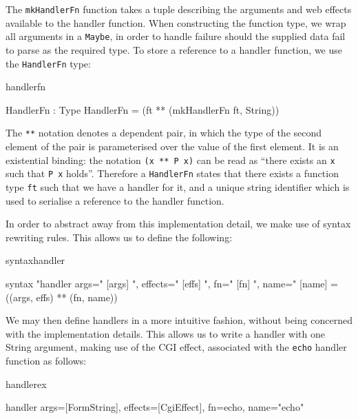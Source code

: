 
\noindent
The \texttt{mkHandlerFn} function takes a tuple describing the arguments and
web effects available to the handler function. When constructing the function
type, we wrap all arguments in a \texttt{Maybe}, in order to handle
failure should the supplied data fail to parse as the required type.
%
To store a reference to a handler function, we use the \texttt{HandlerFn} type:

\begin{SaveVerbatim}{handlerfn}

HandlerFn : Type
HandlerFn = (ft ** (mkHandlerFn ft, String))

\end{SaveVerbatim}

\noindent
The \texttt{**} notation denotes a dependent pair, in which the type of the second
element of the pair is parameterised over the value of the first element. It is
an existential binding:
the notation \texttt{(x ** P x)} can be read as ``there exists an \texttt{x} such that 
\texttt{P x} holds''.
Therefore a \texttt{HandlerFn} states that there exists a function type
\texttt{ft} such that we have a handler for it, and a unique string identifier
which is used to serialise a
reference to the handler function. 

In order to abstract away from this implementation detail, we make use of
\idris{} syntax rewriting rules. This allows us to define the following:

\noindent
\begin{SaveVerbatim}{syntaxhandler}

syntax 
  "handler args=" [args] ", effects=" [effs] ", fn=" [fn] 
  ", name=" [name] = ((args, effs) ** (fn, name))

\end{SaveVerbatim}

\noindent
We may then define handlers in a more intuitive fashion, without being
concerned with the implementation details. This allows us to write a handler
with one String argument, making use of the CGI effect, associated with the
\texttt{echo} handler function as follows:

\begin{SaveVerbatim}{handlerex}

handler args=[FormString], 
        effects=[CgiEffect], 
        fn=echo, 
        name="echo"

\end{SaveVerbatim}


